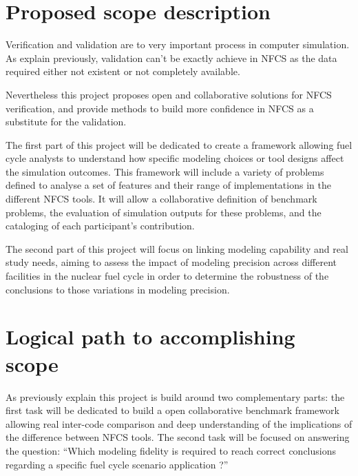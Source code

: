 \section{Proposed scope description}

Verification and validation are to very important process in computer
simulation. As explain previously, validation can't be exactly achieve in NFCS
as the data required either not existent or not completely available. 

Nevertheless this project proposes open and collaborative solutions for NFCS
verification, and provide methods to build more confidence in NFCS as a
substitute for the validation.

The first part of this project will be dedicated to create a framework allowing
fuel cycle analysts to understand how specific modeling choices or tool designs
affect the simulation outcomes. This framework will include a variety of
problems defined to analyse a set of features and their range of implementations
in the different NFCS tools. It will allow a collaborative definition of
benchmark problems, the evaluation of simulation outputs for these problems, and
the cataloging of each participant’s contribution. 

The second part of this project will focus on linking modeling capability and
real study needs, aiming to assess the impact of modeling precision across
different facilities in the nuclear fuel cycle in order to determine the
robustness of the conclusions to those variations in modeling precision. 



\section{Logical path to accomplishing scope}

As previously explain this project is build around two complementary parts: the
first task will be dedicated to build a open collaborative benchmark framework
allowing real inter-code comparison and deep understanding of the implications
of the difference between NFCS tools. The second task will be focused on
answering the question: ``Which modeling fidelity is required to reach correct
conclusions regarding a specific fuel cycle scenario application ?''


